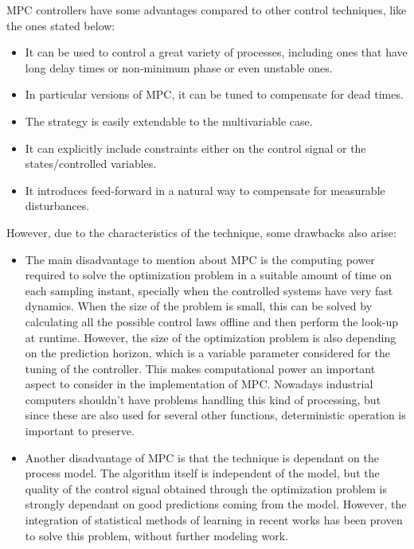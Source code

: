 MPC controllers have some advantages compared to other control techniques, like the ones stated below:

\begin{itemize}

\item It can be used to control a great variety of processes, including ones that have long delay times or non-minimum phase or even unstable ones. 

\item In particular versions of MPC, it can be tuned to compensate for dead times.

\item The strategy is easily extendable to the multivariable case.

\item It can explicitly include constraints either on the control signal or the states/controlled variables.

\item It introduces feed-forward in a natural way to compensate for measurable disturbances.

\end{itemize}

However, due to the characteristics of the technique, some drawbacks also arise:

\begin{itemize}

\item The main disadvantage to mention about MPC is the computing power required to solve the optimization problem in a suitable amount of time on each sampling instant, specially when the controlled systems have very fast dynamics. When the size of the problem is small, this can be solved by calculating all the possible control laws offline and then perform the look-up at runtime. However, the size of the optimization problem is also depending on the prediction horizon, which is a variable parameter considered for the tuning of the controller. This makes computational power an important aspect to consider in the implementation of MPC. Nowadays industrial computers shouldn't have problems handling this kind of processing, but since these are also used for several other functions, deterministic operation is important to preserve.

\item Another disadvantage of MPC is that the technique is dependant on the process model. The algorithm itself is independent of the model, but the quality of the control signal obtained through the optimization problem is strongly dependant on good predictions coming from the model. However, the integration of statistical methods of learning in recent works \cite{Bouffard2012} has been proven to solve this problem, without further modeling work.

\end{itemize}

